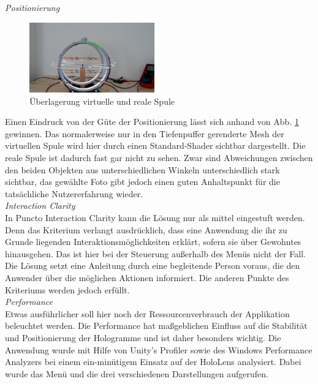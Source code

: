 \textit{Positionierung}
\begin{figure}
	\centering
	\includegraphics[width=0.48\textwidth]{images/HL/model-overlay.jpg}
	\caption{Überlagerung virtuelle und reale Spule}
	\label{img:model-overlay}
\end{figure}
Einen Eindruck von der Güte der Positionierung lässt sich anhand von Abb. \ref{img:model-overlay} gewinnen. Das normalerweise nur in den Tiefenpuffer gerenderte Mesh der virtuellen Spule wird hier durch einen Standard-Shader sichtbar dargestellt. Die reale Spule ist dadurch fast gar nicht zu sehen. Zwar sind Abweichungen zwischen den beiden Objekten aus unterschiedlichen Winkeln unterschiedlich stark sichtbar, das gewählte Foto gibt jedoch einen guten Anhaltspunkt für die tatsächliche Nutzererfahrung wieder.\\

\textit{Interaction Clarity}\\
In Puncto Interaction Clarity kann die Lösung nur als mittel eingestuft werden. Denn das Kriterium verlangt ausdrücklich, dass eine Anwendung die ihr zu Grunde liegenden Interaktionsmöglichkeiten erklärt, sofern sie über Gewohntes hinausgehen. Das ist hier bei der Steuerung außerhalb des Menüs nicht der Fall. Die Lösung setzt eine Anleitung durch eine begleitende Person voraus, die den Anwender über die möglichen Aktionen informiert. Die anderen Punkte des Kriteriums werden jedoch erfüllt.\\

\textit{Performance}\\
Etwas ausführlicher soll hier noch der Ressourcenverbrauch der Applikation beleuchtet werden. Die Performance hat maßgeblichen Einfluss auf die Stabilität und Positionierung der Hologramme und ist daher besonders wichtig. Die Anwendung wurde mit Hilfe von Unity's Profiler sowie des Windows Performance Analyzers bei einem ein-minütigem Einsatz auf der HoloLens analysiert. Dabei wurde das Menü und die drei verschiedenen Darstellungen aufgerufen.

